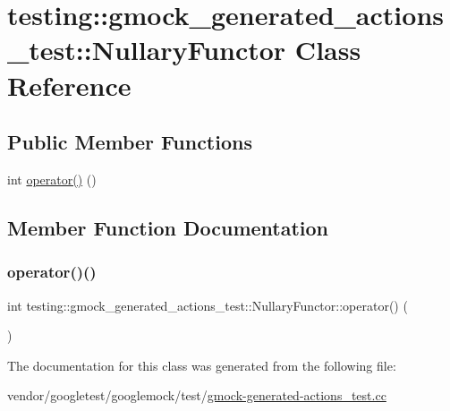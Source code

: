 \hypertarget{classtesting_1_1gmock__generated__actions__test_1_1_nullary_functor}{}\section{testing\+:\+:gmock\+\_\+generated\+\_\+actions\+\_\+test\+:\+:Nullary\+Functor Class Reference}
\label{classtesting_1_1gmock__generated__actions__test_1_1_nullary_functor}
\subsection*{Public Member Functions}
\begin{DoxyCompactItemize}
\item 
int \hyperlink{classtesting_1_1gmock__generated__actions__test_1_1_nullary_functor_afcf5ace9bbb5a2a91482688bdc20fa07}{operator()} ()
\end{DoxyCompactItemize}


\subsection{Member Function Documentation}
\mbox{\label{classtesting_1_1gmock__generated__actions__test_1_1_nullary_functor_afcf5ace9bbb5a2a91482688bdc20fa07}} 
\subsubsection{\texorpdfstring{operator()()}{operator()()}}
{\footnotesize\ttfamily int testing\+::gmock\+\_\+generated\+\_\+actions\+\_\+test\+::\+Nullary\+Functor\+::operator() (\begin{DoxyParamCaption}{ }\end{DoxyParamCaption})\hspace{0.3cm}{\ttfamily [inline]}}



The documentation for this class was generated from the following file\+:\begin{DoxyCompactItemize}
\item 
vendor/googletest/googlemock/test/\hyperlink{gmock-generated-actions__test_8cc}{gmock-\/generated-\/actions\+\_\+test.\+cc}\end{DoxyCompactItemize}
